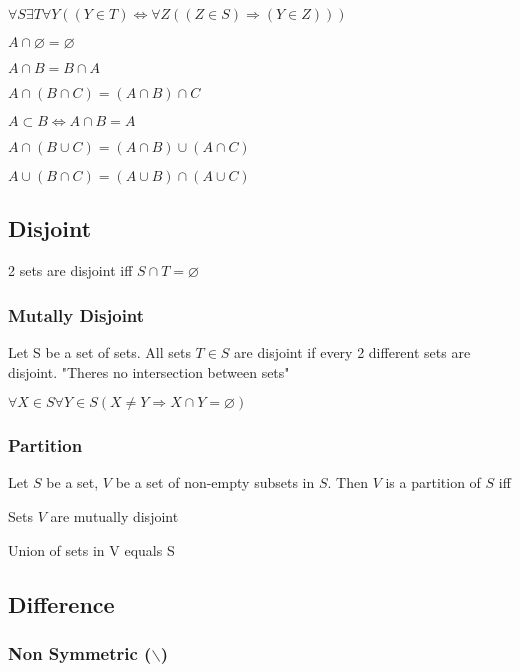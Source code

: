 \documentclass[12pt]{article}
\begin{document}
\begin{spacing}{1.5}
$\forall S \exists T \forall Y ((Y \in T) \Leftrightarrow \forall Z ((Z \in S) \Rightarrow (Y \in Z)))$

\begin{itemize*}
	\item $A \cap \varnothing = \varnothing$
	\item $A \cap B = B \cap A$
	\item $A \cap (B \cap C) = (A \cap B) \cap C$
	\item $A \subset B \Leftrightarrow A \cap B = A$
	\item $A \cap (B \cup C) = (A \cap B) \cup (A \cap C)$
	\item $A \cup (B \cap C) = (A \cup B) \cap (A \cup C)$
\end{itemize*}

\subsection{Disjoint}

2 sets are disjoint iff $S \cap T = \varnothing$

\subsubsection{Mutally Disjoint}

Let S be a set of sets. All sets $T \in S$ are disjoint if every 2 different sets are disjoint. "Theres no intersection between sets"

$\forall X \in S \forall Y \in S (X \neq Y \Rightarrow X \cap Y = \varnothing)$

\subsubsection{Partition}

Let $S$ be a set, $V$ be a set of non-empty subsets in $S$. Then $V$ is a partition of $S$ iff

\begin{itemize*}
	\item Sets $V$ are mutually disjoint
	\item Union of sets in V equals S
\end{itemize*}

\subsection{Difference}

\subsubsection{Non Symmetric ($\backslash$)}


\end{spacing}
\end{document}

